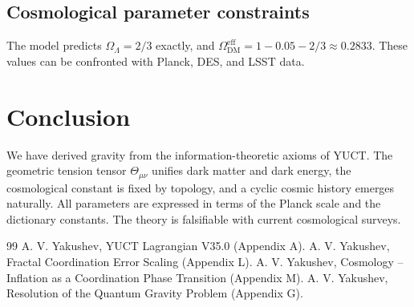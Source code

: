\documentclass[12pt,a4paper]{article}
\begin{document}
	\subsection{Cosmological parameter constraints}
	The model predicts \(\Omega_\Lambda = 2/3\) exactly, and \(\Omega_{\mathrm{DM}}^{\mathrm{eff}} = 1 - 0.05 - 2/3 \approx 0.2833\). These values can be confronted with Planck, DES, and LSST data.
	
	\section{Conclusion}
	We have derived gravity from the information-theoretic axioms of YUCT. The geometric tension tensor \(\Theta_{\mu\nu}\) unifies dark matter and dark energy, the cosmological constant is fixed by topology, and a cyclic cosmic history emerges naturally. All parameters are expressed in terms of the Planck scale and the dictionary constants. The theory is falsifiable with current cosmological surveys.
	
	\begin{thebibliography}{99}
		 A. V. Yakushev, YUCT Lagrangian V35.0 (Appendix A).
		 A. V. Yakushev, Fractal Coordination Error Scaling (Appendix L).
		 A. V. Yakushev, Cosmology -- Inflation as a Coordination Phase Transition (Appendix M).
		 A. V. Yakushev, Resolution of the Quantum Gravity Problem (Appendix G).
	\end{thebibliography}
	
\end{document}
